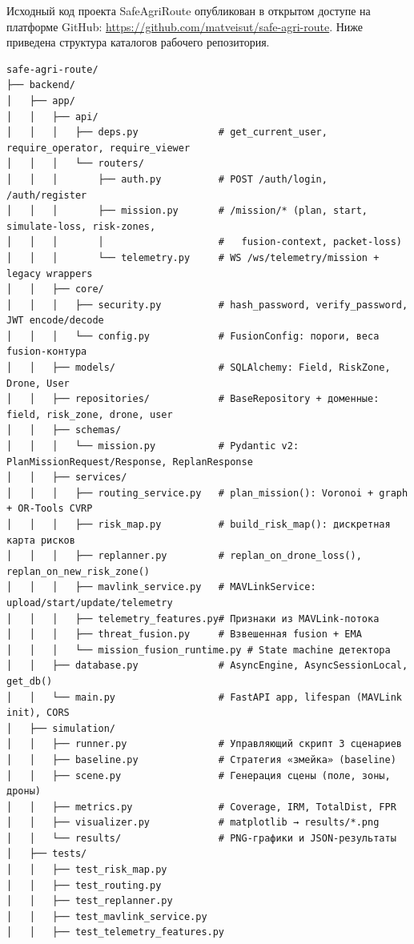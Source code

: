 \documentclass[14pt,a4paper]{extarticle}
\begin{document}
Исходный код проекта SafeAgriRoute опубликован в открытом доступе на платформе GitHub: \url{https://github.com/matveisut/safe-agri-route}. Ниже приведена структура каталогов рабочего репозитория.

\begin{verbatim}
safe-agri-route/
├── backend/
│   ├── app/
│   │   ├── api/
│   │   │   ├── deps.py              # get_current_user, require_operator, require_viewer
│   │   │   └── routers/
│   │   │       ├── auth.py          # POST /auth/login, /auth/register
│   │   │       ├── mission.py       # /mission/* (plan, start, simulate-loss, risk-zones,
│   │   │       │                    #   fusion-context, packet-loss)
│   │   │       └── telemetry.py     # WS /ws/telemetry/mission + legacy wrappers
│   │   ├── core/
│   │   │   ├── security.py          # hash_password, verify_password, JWT encode/decode
│   │   │   └── config.py            # FusionConfig: пороги, веса fusion-контура
│   │   ├── models/                  # SQLAlchemy: Field, RiskZone, Drone, User
│   │   ├── repositories/            # BaseRepository + доменные: field, risk_zone, drone, user
│   │   ├── schemas/
│   │   │   └── mission.py           # Pydantic v2: PlanMissionRequest/Response, ReplanResponse
│   │   ├── services/
│   │   │   ├── routing_service.py   # plan_mission(): Voronoi + graph + OR-Tools CVRP
│   │   │   ├── risk_map.py          # build_risk_map(): дискретная карта рисков
│   │   │   ├── replanner.py         # replan_on_drone_loss(), replan_on_new_risk_zone()
│   │   │   ├── mavlink_service.py   # MAVLinkService: upload/start/update/telemetry
│   │   │   ├── telemetry_features.py# Признаки из MAVLink-потока 
│   │   │   ├── threat_fusion.py     # Взвешенная fusion + EMA 
│   │   │   └── mission_fusion_runtime.py # State machine детектора 
│   │   ├── database.py              # AsyncEngine, AsyncSessionLocal, get_db()
│   │   └── main.py                  # FastAPI app, lifespan (MAVLink init), CORS
│   ├── simulation/
│   │   ├── runner.py                # Управляющий скрипт 3 сценариев
│   │   ├── baseline.py              # Стратегия «змейка» (baseline)
│   │   ├── scene.py                 # Генерация сцены (поле, зоны, дроны)
│   │   ├── metrics.py               # Coverage, IRM, TotalDist, FPR
│   │   ├── visualizer.py            # matplotlib → results/*.png
│   │   └── results/                 # PNG-графики и JSON-результаты
│   ├── tests/
│   │   ├── test_risk_map.py
│   │   ├── test_routing.py
│   │   ├── test_replanner.py
│   │   ├── test_mavlink_service.py
│   │   ├── test_telemetry_features.py

\end{verbatim}
\end{document}
